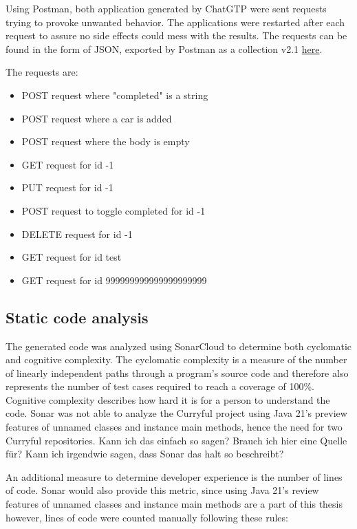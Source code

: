 \documentclass[a4paper]{article}
\begin{document}
\noindent Using Postman, both application generated by ChatGTP were sent requests trying to provoke
unwanted behavior. The applications were restarted after each request to assure
no side effects could mess with the results. The requests can be found in the
form of JSON, exported by Postman as a collection v2.1
\hyperlink{https://github.com/lerchl/curryful-bachelor-thesis-postman-requests}{here}.\newline

\noindent The requests are:
\begin{itemize}
	\item POST request where "completed" is a string
	\item POST request where a car is added
	\item POST request where the body is empty
	\item GET request for id -1
	\item PUT request for id -1
	\item POST request to toggle completed for id -1
	\item DELETE request for id -1
	\item GET request for id test
	\item GET request for id 999999999999999999999
\end{itemize}

\subsection{Static code analysis}
The generated code was analyzed using SonarCloud to determine both cyclomatic
and cognitive complexity. The cyclomatic complexity is a measure of the number
of linearly independent paths through a program's source code and therefore also
represents the number of test cases required to reach a coverage of 100\%.
Cognitive complexity describes how hard it is for a person to understand the
code. Sonar was not able to analyze the Curryful project using Java 21's preview
features of unnamed classes and instance main methods, hence the need for two
Curryful repositories.
Kann ich das einfach so sagen?
Brauch ich hier eine Quelle für? Kann ich irgendwie sagen, dass Sonar das halt so beschreibt? \newline

\noindent An additional measure to determine developer experience is the number
of lines of code. Sonar would also provide this metric, since using Java 21's
review features of unnamed classes and instance main methods are a part of this
thesis however, lines of code were counted manually following these rules:
\end{document}
